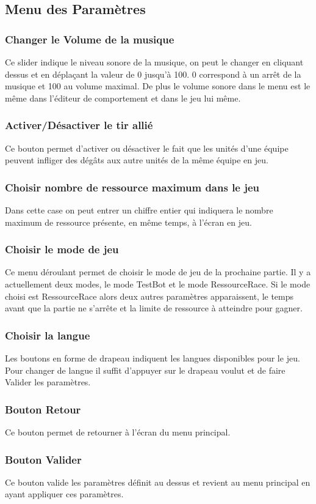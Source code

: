 \documentclass{report}
\begin{document}
\subsection{Menu des Paramètres}
\subsubsection{Changer le Volume de la musique}
Ce slider indique le niveau sonore de la musique, on peut le changer en cliquant dessus et en déplaçant la valeur de 0 jusqu’à 100. 0 correspond à un arrêt de la musique et 100 au volume maximal. De plus le volume sonore dans le menu est le même dans l'éditeur de comportement et dans le jeu lui même.
\subsubsection{Activer/Désactiver le tir allié}
Ce bouton permet d'activer ou désactiver le fait que les unités d'une équipe peuvent infliger des dégâts aux autre unités de la même équipe en jeu.
\subsubsection{Choisir nombre de ressource maximum dans le jeu}
Dans cette case on peut entrer un chiffre entier qui indiquera le nombre maximum de ressource présente, en même temps, à l'écran en jeu.
\subsubsection{Choisir le mode de jeu}
Ce menu déroulant permet de choisir le mode de jeu de la prochaine partie. Il y a actuellement deux modes, le mode TestBot et le mode RessourceRace. Si le mode choisi est RessourceRace alors deux autres paramètres apparaissent, le temps avant que la partie ne s’arrête et la limite de ressource à atteindre pour gagner.
\subsubsection{Choisir la langue}
Les boutons en forme de drapeau indiquent les langues disponibles pour le jeu. Pour changer de langue il suffit d'appuyer sur le drapeau voulut et de faire Valider les paramètres.
\subsubsection{Bouton Retour}
Ce bouton permet de retourner à l'écran du menu principal.
\subsubsection{Bouton Valider}
Ce bouton valide les paramètres définit au dessus et revient au menu principal en ayant appliquer ces paramètres.
\end{document}
